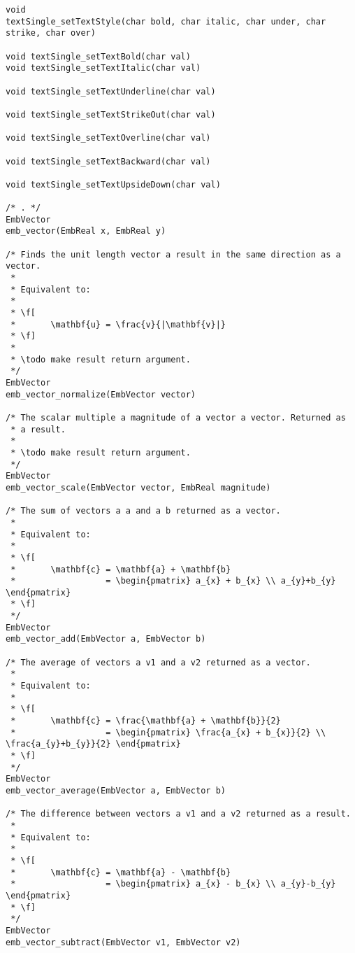\begin{lstlisting}
void
textSingle_setTextStyle(char bold, char italic, char under, char strike, char over)

void textSingle_setTextBold(char val)
void textSingle_setTextItalic(char val) 

void textSingle_setTextUnderline(char val)

void textSingle_setTextStrikeOut(char val)

void textSingle_setTextOverline(char val)

void textSingle_setTextBackward(char val)

void textSingle_setTextUpsideDown(char val)

/* . */
EmbVector
emb_vector(EmbReal x, EmbReal y)

/* Finds the unit length vector a result in the same direction as a vector.
 *
 * Equivalent to:
 *
 * \f[
 *       \mathbf{u} = \frac{v}{|\mathbf{v}|}
 * \f]
 *
 * \todo make result return argument.
 */
EmbVector
emb_vector_normalize(EmbVector vector)

/* The scalar multiple a magnitude of a vector a vector. Returned as
 * a result.
 *
 * \todo make result return argument.
 */
EmbVector
emb_vector_scale(EmbVector vector, EmbReal magnitude)

/* The sum of vectors a a and a b returned as a vector.
 *
 * Equivalent to:
 *
 * \f[
 *       \mathbf{c} = \mathbf{a} + \mathbf{b}
 *                  = \begin{pmatrix} a_{x} + b_{x} \\ a_{y}+b_{y} \end{pmatrix}
 * \f]
 */
EmbVector
emb_vector_add(EmbVector a, EmbVector b)

/* The average of vectors a v1 and a v2 returned as a vector.
 *
 * Equivalent to:
 *
 * \f[
 *       \mathbf{c} = \frac{\mathbf{a} + \mathbf{b}}{2}
 *                  = \begin{pmatrix} \frac{a_{x} + b_{x}}{2} \\ \frac{a_{y}+b_{y}}{2} \end{pmatrix}
 * \f]
 */
EmbVector
emb_vector_average(EmbVector a, EmbVector b)

/* The difference between vectors a v1 and a v2 returned as a result.
 *
 * Equivalent to:
 *
 * \f[
 *       \mathbf{c} = \mathbf{a} - \mathbf{b}
 *                  = \begin{pmatrix} a_{x} - b_{x} \\ a_{y}-b_{y} \end{pmatrix}
 * \f]
 */
EmbVector
emb_vector_subtract(EmbVector v1, EmbVector v2)


\end{lstlisting}
